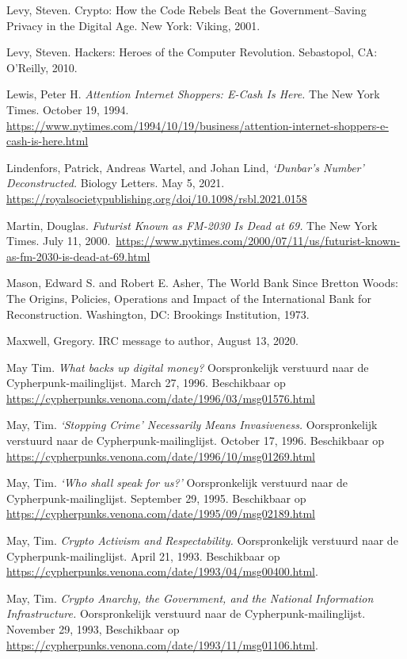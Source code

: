 \documentclass[
  a5paper,
  smalldemyvopaper,11pt,twoside,onecolumn,openright,extrafontsizes,
hidelinks]{memoir}
\begin{document}
Levy, Steven. Crypto: How the Code Rebels Beat the Government--Saving
Privacy in the Digital Age. New York: Viking, 2001.

Levy, Steven. Hackers: Heroes of the Computer Revolution. Sebastopol,
CA: O'Reilly, 2010.

Lewis, Peter H. \emph{Attention Internet Shoppers: E-Cash Is Here.} The
New York Times. October 19, 1994.
\url{https://www.nytimes.com/1994/10/19/business/attention-internet-shoppers-e-cash-is-here.html}

Lindenfors, Patrick, Andreas Wartel, and Johan Lind, \emph{`Dunbar's
Number' Deconstructed.} Biology Letters. May 5, 2021.
\url{https://royalsocietypublishing.org/doi/10.1098/rsbl.2021.0158}

Martin, Douglas. \emph{Futurist Known as FM-2030 Is Dead at 69.} The New
York Times. July 11,
2000.~\url{https://www.nytimes.com/2000/07/11/us/futurist-known-as-fm-2030-is-dead-at-69.html}

Mason, Edward S. and Robert E. Asher, The World Bank Since Bretton
Woods: The Origins, Policies, Operations and Impact of the International
Bank for Reconstruction. Washington, DC: Brookings Institution, 1973.

Maxwell, Gregory. IRC message to author, August 13, 2020.

May Tim. \emph{What backs up digital money?} Oorspronkelijk verstuurd
naar de Cypherpunk-mailinglijst. March 27, 1996. Beschikbaar op
\url{https://cypherpunks.venona.com/date/1996/03/msg01576.html}

May, Tim. \emph{`Stopping Crime' Necessarily Means Invasiveness.}
Oorspronkelijk verstuurd naar de Cypherpunk-mailinglijst. October 17,
1996. Beschikbaar op
\url{https://cypherpunks.venona.com/date/1996/10/msg01269.html}

May, Tim. \emph{`Who shall speak for us?'} Oorspronkelijk verstuurd naar
de Cypherpunk-mailinglijst. September 29, 1995. Beschikbaar op
\url{https://cypherpunks.venona.com/date/1995/09/msg02189.html}

May, Tim. \emph{Crypto Activism and Respectability.} Oorspronkelijk
verstuurd naar de Cypherpunk-mailinglijst. April 21, 1993. Beschikbaar
op \url{https://cypherpunks.venona.com/date/1993/04/msg00400.html}.

May, Tim. \emph{Crypto Anarchy, the Government, and the National
Information Infrastructure.} Oorspronkelijk verstuurd naar de
Cypherpunk-mailinglijst. November 29, 1993, Beschikbaar op
\url{https://cypherpunks.venona.com/date/1993/11/msg01106.html}.
\end{document}
